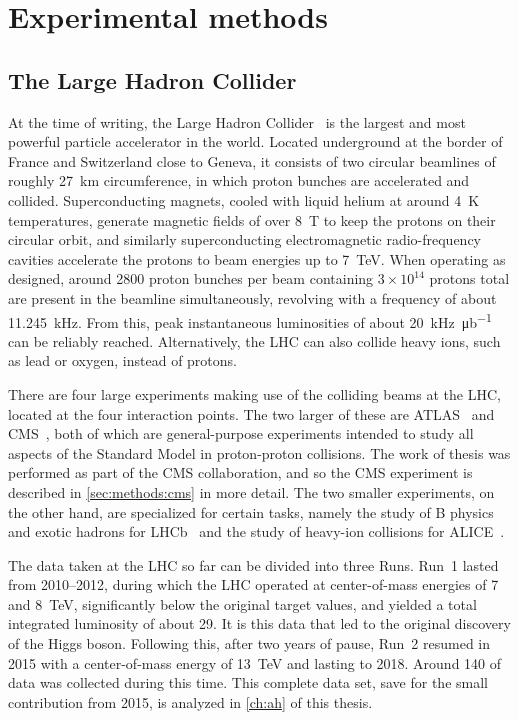 \chapter{Experimental methods}
\label{ch:methods}

\section{The Large Hadron Collider}

At the time of writing, the Large Hadron Collider~\cite{Bruning:2004ej} is the largest and most powerful particle accelerator in the world. Located underground at the border of France and Switzerland close to Geneva, it consists of two circular beamlines of roughly 27~km circumference, in which proton bunches are accelerated and collided. Superconducting magnets, cooled with liquid helium at around 4~K temperatures, generate magnetic fields of over 8~T to keep the protons on their circular orbit, and similarly superconducting electromagnetic radio-frequency cavities accelerate the protons to beam energies up to 7~TeV. When operating as designed, around 2800 proton bunches per beam containing $3\times10^{14}$ protons total are present in the beamline simultaneously, revolving with a frequency of about 11.245~kHz. From this, peak instantaneous luminosities of about \SI{20}{\kilo\hertz\per\micro\barn} can be reliably reached. Alternatively, the LHC can also collide heavy ions, such as lead or oxygen, instead of protons.

There are four large experiments making use of the colliding beams at the LHC, located at the four interaction points. The two larger of these are ATLAS~\cite{ATLAS:2008xda} and CMS~\cite{CMS:2008xjf}, both of which are general-purpose experiments intended to study all aspects of the Standard Model in proton-proton collisions. The work of thesis was performed as part of the CMS collaboration, and so the CMS experiment is described in \cref{sec:methods:cms} in more detail. The two smaller experiments, on the other hand, are specialized for certain tasks, namely the study of B physics and exotic hadrons for LHCb~\cite{LHCb:2008vvz} and the study of heavy-ion collisions for ALICE~\cite{ALICE:2008ngc}.

The data taken at the LHC so far can be divided into three Runs. Run~1 lasted from 2010--2012, during which the LHC operated at center-of-mass energies of 7 and 8~TeV, significantly below the original target values, and yielded a total integrated luminosity of about \SI{29}{\fbinv}. It is this data that led to the original discovery of the Higgs boson. Following this, after two years of pause, Run~2 resumed in 2015 with a center-of-mass energy of 13~TeV and lasting to 2018. Around \SI{140}{\fbinv} of data was collected during this time. This complete data set, save for the small contribution from 2015, is analyzed in \cref{ch:ah} of this thesis.

